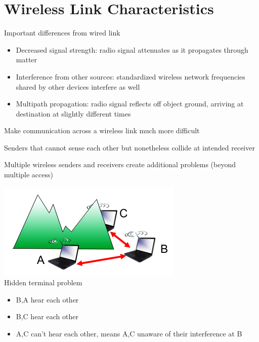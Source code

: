 \documentclass{article}[18pt]
\begin{document}
\section{Wireless Link Characteristics}
Important differences from wired link
\begin{itemize}
	\item Decreased signal strength: radio signal attenuates as it propagates through matter
	\item Interference from other sources: standardized wireless network frequencies shared by other devices interfere as well
	\item Multipath propagation: radio signal reflects off object ground, arriving at destination at slightly different times
\end{itemize}
Make communication across a wireless link much more difficult
\begin{defin}
Senders that cannot sense each other but nonetheless collide at intended receiver
\end{defin}
Multiple wireless senders and receivers create additional problems (beyond multiple access)\\
\begin{minipage}{0.5\textwidth}
\includegraphics[scale=0.7]{"hidden terminal"}\\
Hidden terminal problem
\begin{itemize}
	\item B,A hear each other
	\item B,C hear each other
	\item A,C can't hear each other, means A,C unaware of their interference at B 
\end{itemize}
\end{minipage}
\end{document}
